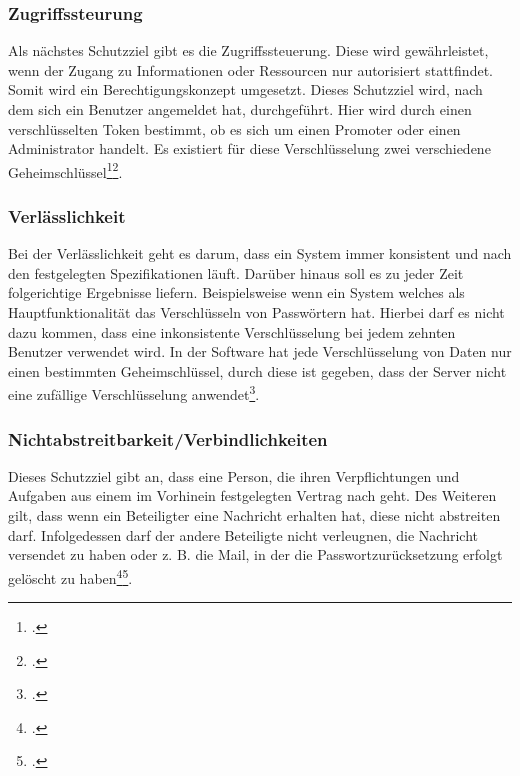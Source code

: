 \subsubsection{Zugriffssteurung}
Als nächstes Schutzziel gibt es die Zugriffssteuerung. Diese wird gewährleistet, wenn der Zugang zu Informationen oder Ressourcen nur autorisiert stattfindet. Somit wird ein Berechtigungskonzept umgesetzt. 
Dieses Schutzziel wird, nach dem sich ein Benutzer angemeldet hat, durchgeführt. Hier wird durch einen verschlüsselten Token bestimmt, ob es sich um einen Promoter oder einen Administrator handelt. Es existiert für diese Verschlüsselung zwei verschiedene Geheimschlüssel\footcite{Lehrunterlagen-HTL-cloud}\footcite{zugang}.

\subsubsection{Verlässlichkeit}
Bei der Verlässlichkeit geht es darum, dass ein System immer konsistent und nach den festgelegten Spezifikationen läuft. Darüber hinaus soll es zu jeder Zeit folgerichtige Ergebnisse liefern. Beispielsweise wenn ein System welches als Hauptfunktionalität das Verschlüsseln von Passwörtern hat. Hierbei darf es nicht dazu kommen, dass eine inkonsistente Verschlüsselung bei jedem zehnten Benutzer verwendet wird.
In der Software hat jede Verschlüsselung von Daten nur einen bestimmten Geheimschlüssel, durch diese ist gegeben, dass der Server nicht eine zufällige Verschlüsselung anwendet\footcite{Lehrunterlagen-HTL-cloud}.


\subsubsection{Nichtabstreitbarkeit/Verbindlichkeiten}
Dieses Schutzziel gibt an, dass eine Person, die ihren Verpflichtungen und Aufgaben aus einem im Vorhinein festgelegten Vertrag nach geht. Des Weiteren gilt, dass wenn ein Beteiligter eine Nachricht erhalten hat, diese nicht abstreiten darf. Infolgedessen darf der andere Beteiligte nicht verleugnen, die Nachricht versendet zu haben oder z. B. die Mail, in der die Passwortzurücksetzung erfolgt gelöscht zu haben\footcite{Lehrunterlagen-HTL-cloud}\footcite{non-repu}.

